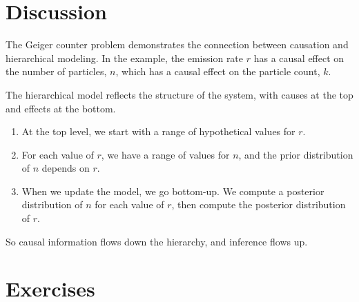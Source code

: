 \documentclass[12pt]{book}
\begin{document}
\section{Discussion}

The Geiger counter problem demonstrates the connection between
causation and hierarchical modeling.  In the example, the
emission rate $r$ has a causal effect on the number of particles,
$n$, which has a causal effect on the particle count, $k$.

The hierarchical model reflects the structure of the
system, with causes at the top and effects at the bottom.

\begin{enumerate}

\item At the top level, we start with a range of hypothetical
values for $r$.

\item For each value of $r$, we have a range of values for $n$,
and the prior distribution of $n$ depends on $r$.

\item When we update the model, we go bottom-up.  We compute
a posterior distribution of $n$ for each value of $r$, then
compute the posterior distribution of $r$.

\end{enumerate}

So causal information flows down the hierarchy, and inference flows
up.


\section{Exercises}
\end{document}
